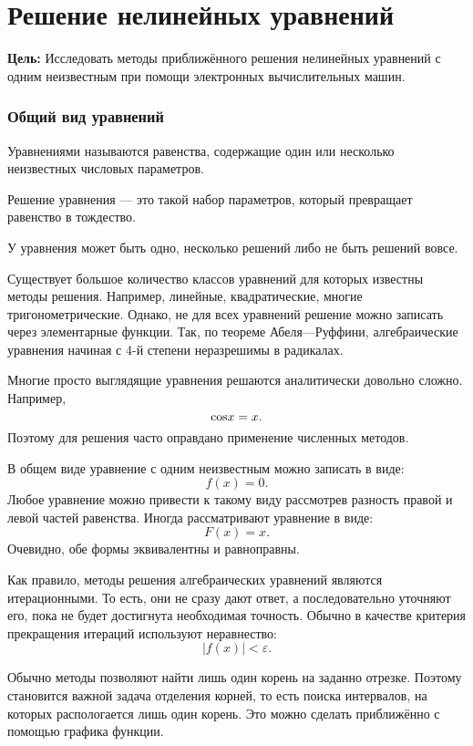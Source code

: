 \section{Решение нелинейных уравнений}

\noindent \textbf{Цель:} Исследовать методы приближённого решения
нелинейных уравнений с одним неизвестным при помощи электронных вычислительных
машин.

\medskip{}



\subsubsection{Общий вид уравнений}
\begin{defn}
Уравнениями называются равенства, содержащие один или несколько неизвестных
числовых параметров.
\end{defn}

\begin{defn}
Решение уравнения — это такой набор параметров, который превращает
равенство в тождество.
\end{defn}
У уравнения может быть одно, несколько решений либо не быть решений
вовсе.

Существует большое количество классов уравнений для которых известны
методы решения. Например, линейные, квадратические, многие тригонометрические.
Однако, не для всех уравнений решение можно записать через элементарные
функции. Так, по теореме Абеля—Руффини, алгебраические уравнения начиная
с 4-й степени неразрешимы в радикалах.

Многие просто выглядящие уравнения решаются аналитически довольно
сложно. Например,
\[
\text{\ensuremath{\cos}}x=x.
\]
Поэтому для решения часто оправдано применение численных методов.

В общем виде уравнение с одним неизвестным можно записать в виде:
\[
f(x)=0.
\]
Любое уравнение можно привести к такому виду рассмотрев разность правой
и левой частей равенства. Иногда рассматривают уравнение в виде:
\[
F(x)=x.
\]
Очевидно, обе формы эквивалентны и равноправны.

Как правило, методы решения алгебраических уравнений являются итерационными.
То есть, они не сразу дают ответ, а последовательно уточняют его,
пока не будет достигнута необходимая точность. Обычно в качестве критерия
прекращения итераций используют неравнество:
\[
|f(x)|<\varepsilon.
\]


Обычно методы позволяют найти лишь один корень на заданно отрезке.
Поэтому становится важной задача отделения корней, то есть поиска
интервалов, на которых распологается лишь один корень. Это можно сделать
приближённо с помощью графика функции.


